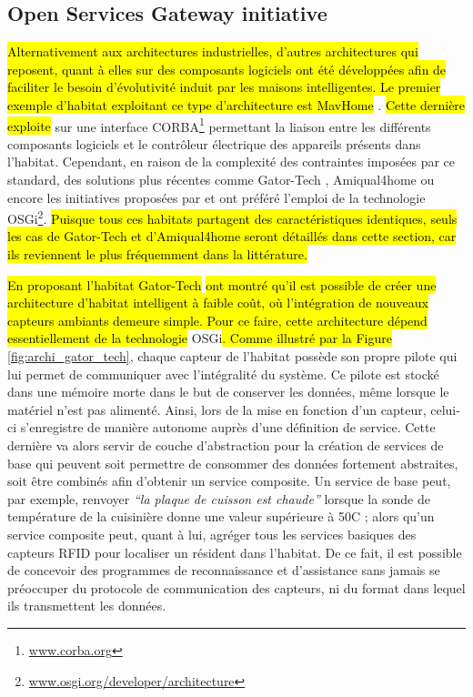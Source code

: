 \subsection{Open Services Gateway initiative}

\hl{Alternativement aux architectures industrielles, d'autres architectures qui reposent, quant à elles sur des composants logiciels ont été développées afin de faciliter le besoin d'évolutivité induit par les maisons intelligentes. Le premier exemple d'habitat exploitant ce type d'architecture est MavHome} \citep{DJCook2003}. \hl{Cette dernière exploite} sur une interface \ac{CORBA}\footnote{\url{www.corba.org}} permettant la liaison entre les différents composants logiciels et le contrôleur électrique des appareils présents dans l'habitat. Cependant, en raison de la complexité des contraintes imposées par ce standard, des solutions plus récentes comme Gator-Tech \citep{Helal2005}, Amiqual4home \citep{Lago2017} ou encore les initiatives proposées par \cite{Novak2011} et \cite{Cheng2012} ont préféré l'emploi de la technologie \ac{OSGi}\footnote{\url{www.osgi.org/developer/architecture}}. \hl{Puisque tous ces habitats partagent des caractéristiques identiques, seuls les cas de Gator-Tech et d'Amiqual4home seront détaillés dans cette section, car ils reviennent le plus fréquemment dans la littérature.}

\hl{En proposant l'habitat Gator-Tech} \cite{Helal2005} \hl{ont montré qu'il est possible de créer une architecture d'habitat intelligent à faible coût, où l'intégration de nouveaux capteurs ambiants demeure simple. Pour ce faire, cette architecture dépend essentiellement de la technologie} \acs{OSGi}\hl{. Comme illustré par la Figure} \ref{fig:archi_gator_tech}, chaque capteur de l'habitat possède son propre pilote qui lui permet de communiquer avec l'intégralité du système. Ce pilote est stocké dans une mémoire morte dans le but de conserver les données, même lorsque le matériel n'est pas alimenté. Ainsi, lors de la mise en fonction d'un capteur, celui-ci s'enregistre de manière autonome auprès d'une définition de service. Cette dernière va alors servir de couche d'abstraction pour la création de services de base qui peuvent soit permettre de consommer des données fortement abstraites, soit être combinés afin d'obtenir un service composite. Un service de base peut, par exemple, renvoyer \textit{``la plaque de cuisson est chaude''} lorsque la sonde de température de la cuisinière donne une valeur supérieure à 50\textdegree{}C ; alors qu'un service composite peut, quant à lui, agréger tous les services basiques des capteurs \ac{RFID} pour localiser un résident dans l'habitat. De ce fait, il est possible de concevoir des programmes de reconnaissance et d'assistance sans jamais se préoccuper du protocole de communication des capteurs, ni du format dans lequel ils transmettent les données.

